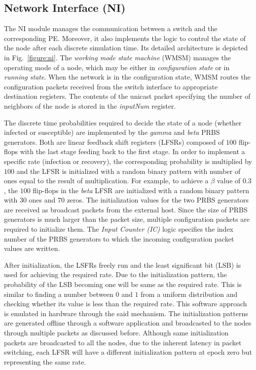 \subsection{Network Interface (NI)}
\label{sec:ni}

The NI module manages the communication between a switch and the corresponding PE. Moreover, it also implements the logic to control the state of the node after each discrete simulation time.
Its detailed architecture is depicted in Fig.~\ref{figure:ni}.
The \emph{working mode state machine} (WMSM) manages the operating mode of a node, which may be either in \emph{configuration state} or in \emph{running state}.
When the network is in the configuration state, WMSM routes the configuration packets received from the switch interface to appropriate destination registers.
The contents of the unicast packet specifying the number of neighbors of the node is stored in the \emph{inputNum} register.

The discrete time probabilities required to decide the state of a node (whether infected or susceptible) are implemented by the \emph{gamma} and \emph{beta} PRBS generators.
Both are linear feedback shift registers (LFSRs) composed of $100$ flip-flops with the last stage feeding back to the first stage.
In order to implement a specific rate (infection or recovery), the corresponding probability is multiplied by $100$ and the LFSR is initialized with a random binary pattern with number of ones equal to the result of multiplication. 
For example, to achieve a $\beta$ value of $0.3$, the $100$ flip-flops in the \emph{beta} LFSR are initialized with a random binary pattern with $30$ ones and $70$ zeros.
The initialization values for the two PRBS generators are received as broadcast packets from the external host.
Since the size of PRBS generators is much larger than the packet size, multiple configuration packets are required to initialize them.
The \emph{Input Counter (IC)} logic specifies the index number of the PRBS generators to which the incoming configuration packet values are written.


After initialization, the LSFRs freely run and the least significant bit (LSB) is used for achieving the required rate.
Due to the initialization pattern, the probability of the LSB becoming one will be same as the required rate.
This is similar to finding a number between $0$ and $1$ from a uniform distribution and checking whether its value is less than the required rate.
This software approach is emulated in hardware through the said mechanism.
The initialization patterns are generated offline through a software application and broadcasted to the nodes through multiple packets as discussed before.
Although same initialization packets are broadcasted to all the nodes, due to the inherent latency in packet switching, each LFSR will have a different initialization pattern at epoch zero but representing the same rate.

